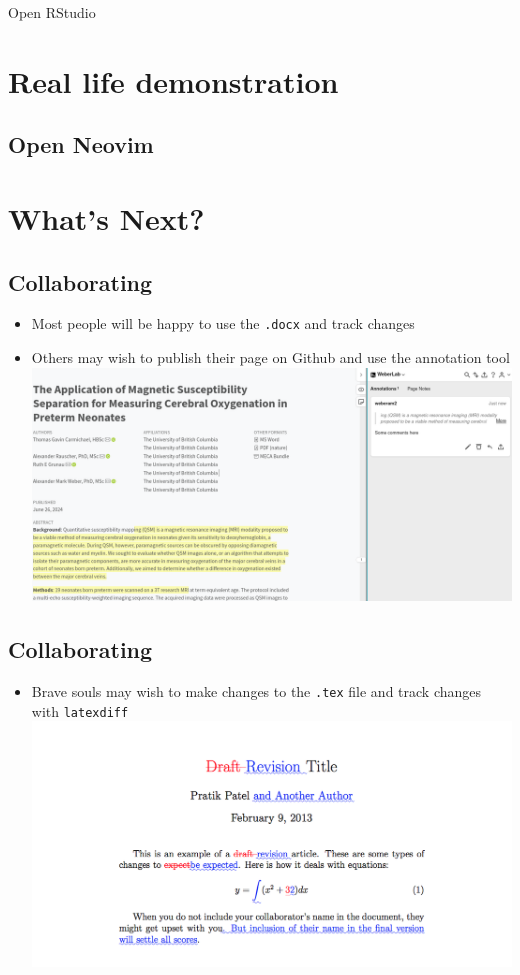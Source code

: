 \documentclass[
  letterpaper,
  DIV=11,
  numbers=noendperiod]{scrartcl}
\providecommand{\tightlist}{%
  \setlength{\itemsep}{0pt}\setlength{\parskip}{0pt}}\usepackage{longtable,booktabs,array}
\begin{document}
Open RStudio

\section{Real life demonstration}\label{real-life-demonstration}

\subsection{Open Neovim}\label{open-neovim}

\section{What's Next?}\label{whats-next}

\subsection{Collaborating}\label{collaborating}

\begin{itemize}
\item
  Most people will be happy to use the \texttt{.docx} and track changes
\item
  Others may wish to publish their page on Github and use the annotation
  tool \includegraphics{img/annotate.png}
\end{itemize}

\subsection{Collaborating}\label{collaborating-1}

\begin{itemize}
\tightlist
\item
  Brave souls may wish to make changes to the \texttt{.tex} file and
  track changes with \texttt{latexdiff}
  \includegraphics{img/latexdiff.png}
\end{itemize}
\end{document}
